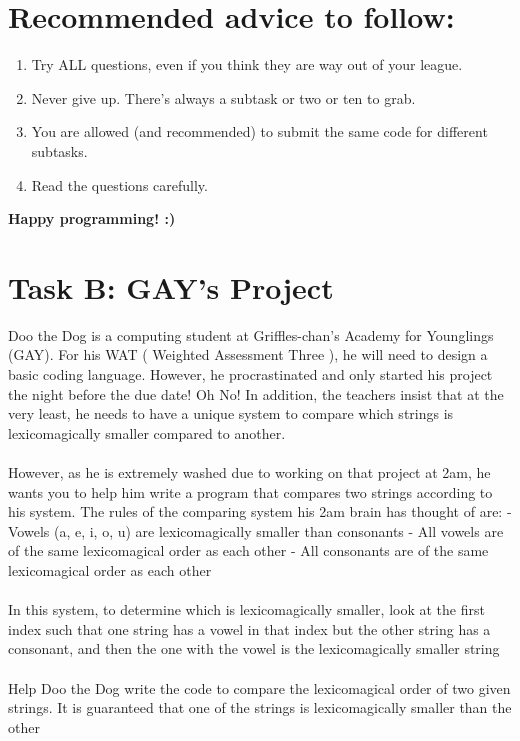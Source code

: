 \documentclass{report}
\begin{document}
\pagebreak
\hfil \break \hfill \break

\section*{Recommended advice to follow:}
\begin{enumerate}
    \item Try ALL questions, even if you think they are way out of your league.
    \item Never give up. There's always a subtask or two or ten to grab.
    \item You are allowed (and recommended) to submit the same code for different subtasks.
    \item Read the questions carefully.
\end{enumerate}

\hfill \hfill \hfill \hfill \hfill

\begin{center}
    \textbf{\Huge Happy programming! :)}
\end{center}

\pagebreak
\hfill \break \hfill \break

\section*{Task B: GAY's Project}
Doo the Dog is a computing student at Griffles-chan's Academy for Younglings (GAY). For his WAT ( Weighted Assessment Three ), he will need to design a basic coding language. However, he procrastinated and only started his project the night before the due date! Oh No! In addition, the teachers insist that at the very least, he needs to have a unique system to compare which strings is lexicomagically smaller compared to another. 
\\\\
However, as he is extremely washed due to working on that project at 2am, he wants you to help him write a program that compares two strings according to his system. The rules of the comparing system his 2am brain has thought of are:
- Vowels (a, e, i, o, u) are lexicomagically smaller than consonants 
- All vowels are of the same lexicomagical order as each other
- All consonants are of the same lexicomagical order as each other
\\\\
In this system, to determine which is lexicomagically smaller, look at the first index such that one string has a vowel in that index but the other string has a consonant, and then the one with the vowel is the lexicomagically smaller string
\\\\
Help Doo the Dog write the code to compare the lexicomagical order of two given strings. It is guaranteed that one of the strings is lexicomagically smaller than the other
\end{document}
